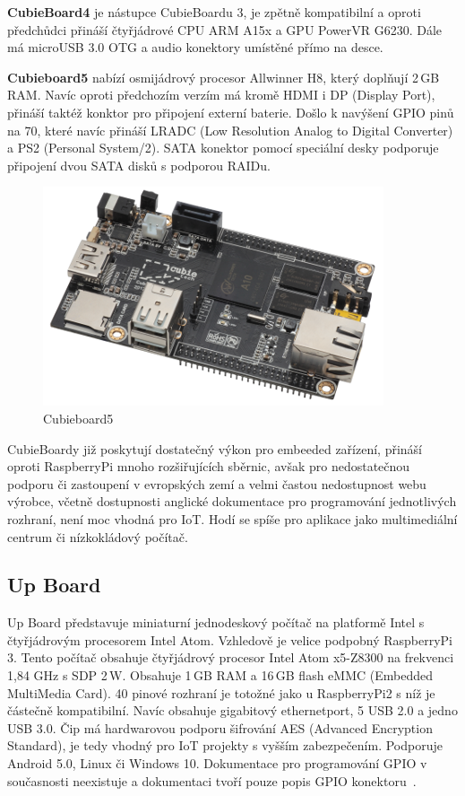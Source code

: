 		\textbf{CubieBoard4} je nástupce CubieBoardu 3, je zpětně kompatibilní a oproti předchůdci přináší čtyřjádrové CPU ARM A15x a GPU PowerVR G6230. Dále má microUSB 3.0 OTG a audio konektory umístěné přímo na desce.
		
			\textbf{Cubieboard5 }nabízí osmijádrový procesor Allwinner H8, který doplňují 2\,GB RAM. Navíc oproti předchozím verzím má kromě HDMI i DP (Display Port), přináší taktéž konktor pro připojení externí baterie. Došlo k navýšení GPIO pinů na 70, které navíc přináší LRADC (Low Resolution Analog to Digital Converter) a PS2 (Personal System/2). SATA konektor pomocí speciální desky podporuje připojení dvou SATA disků s podporou RAIDu.
		
	\begin{figure}[!h]
  \begin{center}
    \includegraphics[scale=0.75]{obrazky/embed_cubie_1}
  \end{center}
  \caption{Cubieboard5~\cite{CubieBoards}}
\end{figure}
		

CubieBoardy již poskytují dostatečný výkon pro embeeded zařízení, přináší oproti RaspberryPi mnoho rozšiřujících sběrnic, avšak pro nedostatečnou podporu či zastoupení v evropských zemí a velmi častou nedostupnost webu výrobce, včetně dostupnosti anglické dokumentace pro  programování jednotlivých rozhraní, není moc vhodná pro IoT. Hodí se spíše pro aplikace jako multimediální centrum či nízkokládový počítač. 	


\subsection{Up Board}
		Up Board představuje miniaturní jednodeskový počítač na platformě Intel s čtyřjádrovým procesorem Intel Atom. Vzhledově je velice podpobný RaspberryPi 3. 
		Tento počítač obsahuje čtyřjádrový procesor Intel Atom x5-Z8300 na frekvenci 1,84 GHz s SDP 2\,W. Obsahuje 1\,GB RAM a 16\,GB flash eMMC (Embedded MultiMedia Card). 40 pinové rozhraní je totožné jako u RaspberryPi2 s níž je částečně kompatibilní. Navíc obsahuje gigabitový ethernetport, 5 USB 2.0 a jedno USB 3.0. Čip má hardwarovou podporu šifrování AES (Advanced Encryption Standard), je tedy vhodný pro IoT projekty s vyšším zabezpečením. Podporuje Android 5.0, Linux či Windows 10. Dokumentace pro programování GPIO v současnosti neexistuje a dokumentaci tvoří pouze popis GPIO konektoru~\cite{UpBoard}.

